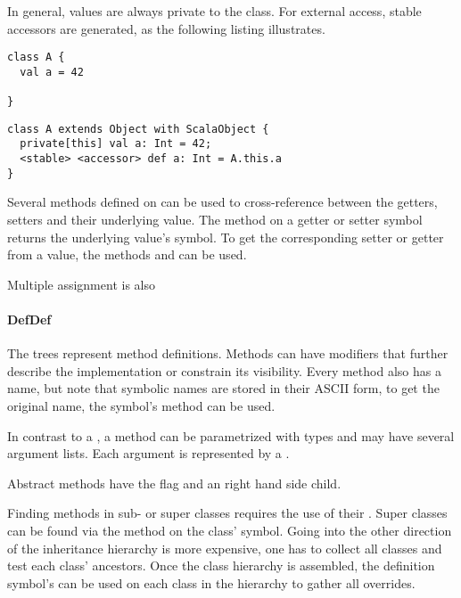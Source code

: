 In general, values are always private to the class. For external access, stable accessors are generated, as the following listing illustrates.

\begin{multicols}{2}
\begin{lstlisting}
class A {
  val a = 42

}
\end{lstlisting}
\begin{lstlisting}
class A extends Object with ScalaObject {
  private[this] val a: Int = 42;
  <stable> <accessor> def a: Int = A.this.a
}
\end{lstlisting}
\end{multicols}

Several methods defined on  can be used to cross-reference between the getters, setters and their underlying value. The  method on a getter or setter symbol returns the underlying value's symbol. To get the corresponding setter or getter from a value, the methods  and  can be used.

Multiple assignment is also


\paragraph{DefDef} 

\noindent The  trees represent method definitions. Methods can have modifiers that further describe the implementation or constrain its visibility. Every method also has a name, but note that symbolic names are stored in their ASCII form, to get the original name, the symbol's  method can be used.

In contrast to a , a method can be parametrized with types and may have several argument lists. Each argument is represented by a .

Abstract methods have the  flag and an  right hand side child.

Finding methods in sub- or super classes requires the use of their . Super classes can be found via the  method on the class' symbol. Going into the other direction of the inheritance hierarchy is more expensive, one has to collect all classes and test each class' ancestors. Once the class hierarchy is assembled, the definition symbol's  can be used on each class in the hierarchy to gather all overrides.


